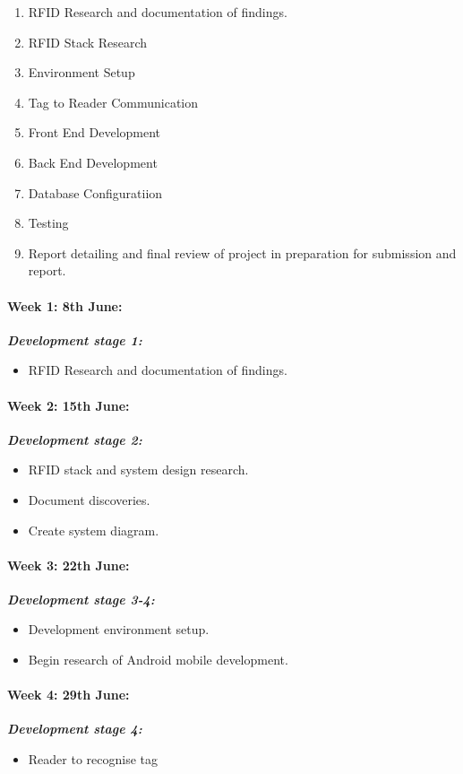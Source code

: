 \documentclass[a4paper, 11pt]{article}
\begin{document}
\begin{enumerate}
	\item RFID Research and documentation of findings.
	\item RFID Stack Research
	\item Environment Setup
	\item Tag to Reader Communication
	\item Front End Development
	\item Back End Development
	\item Database Configuratiion
	\item Testing
	\item Report detailing and final review of project in preparation for submission and report.
 \end{enumerate}

\iffalse
\paragraph{\textbf{Week 1: 8th June:	}} \textbf{\emph{Development stage 1:}}
\begin{itemize}
  \item  RFID Research and documentation of findings.
\end{itemize}

\paragraph{\textbf{Week 2: 15th June:}} \textbf{\emph{Development stage 2: }}
\begin{itemize}
  \item RFID stack and system design research.
  \item Document discoveries.
  \item Create system diagram. 
\end{itemize}

\paragraph{\textbf{Week 3: 22th June:}}  \textbf{\emph{Development stage 3-4: }}
\begin{itemize}
  \item Development environment setup. 
  \item Begin research of Android mobile development. 
\end{itemize}

\paragraph{\textbf{Week 4: 29th June:}}  \textbf{\emph{Development stage 4: }}
\begin{itemize}
  \item Reader to recognise tag
  \end{itemize}
\end{document}
